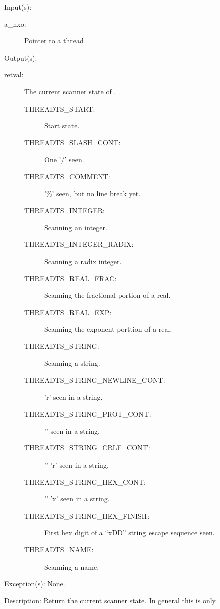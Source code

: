 \begin{capi}
	\begin{capilist}
	\item[Input(s): ]
		\begin{description}\item[]
		\item[a\_nxo: ]
			Pointer to a thread .
		\end{description}
	\item[Output(s): ]
		\begin{description}\item[]
		\item[retval: ] The current scanner state of .
			\begin{description}\item[]
			\item[THREADTS\_START: ] Start state.
			\item[THREADTS\_SLASH\_CONT: ] One '/' seen.
			\item[THREADTS\_COMMENT: ] '\%' seen, but no line break
				yet.
			\item[THREADTS\_INTEGER: ] Scanning an integer.
			\item[THREADTS\_INTEGER\_RADIX: ] Scanning a radix
				integer.
			\item[THREADTS\_REAL\_FRAC: ] Scanning the fractional
				portion of a real.
			\item[THREADTS\_REAL\_EXP: ] Scanning the exponent
				porttion of a real.
			\item[THREADTS\_STRING: ] Scanning a string.
			\item[THREADTS\_STRING\_NEWLINE\_CONT: ] '{\bs}r' seen
				in a string.
			\item[THREADTS\_STRING\_PROT\_CONT: ] '{\bs}{\bs}' seen
				in a string.
			\item[THREADTS\_STRING\_CRLF\_CONT: ] '{\bs}' '{\bs}r'
				seen in a string.
			\item[THREADTS\_STRING\_HEX\_CONT: ] '{\bs}' 'x' seen in
				a string.
			\item[THREADTS\_STRING\_HEX\_FINISH: ] First hex digit
				of a ``{\bs}xDD'' string escape sequence seen.
			\item[THREADTS\_NAME: ] Scanning a name.
			\end{description}
		\end{description}
	\item[Exception(s): ] None.
	\item[Description: ]
		Return the current scanner state.  In general this is only

\end{capilist}
\end{capi}
